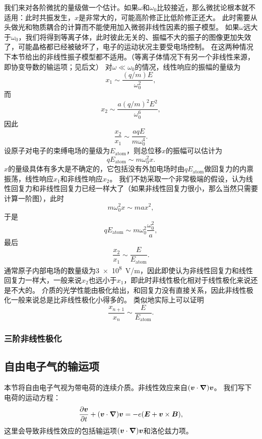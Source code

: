 我们来对各阶微扰的量级做一个估计。如果$\omega$和$\omega_0$比较接近，那么微扰论根本就不适用：此时共振发生，$x$是非常大的，可能高阶修正比低阶修正还大。
此时需要从头做光和物质耦合的计算而不能使用加入微弱非线性因素的振子模型。
如果$\omega$远大于$\omega_0$，我们将得到等离子体，此时彼此无关的、振幅不大的振子的图像更加失效了，可能晶格都已经被破坏了，电子的运动状况主要受电场控制。
在这两种情况下本节给出的非线性振子模型都不适用。（等离子体情况下有另一个非线性来源，即协变导数的输运项；见后文）
对$\omega \ll \omega_0$的情况，线性响应的振幅的量级为
\[
    x_1 \sim \frac{(q/m) E}{\omega_0^2},
\]
而
\[
    x_2 \sim \frac{a (q/m)^2 E^2}{\omega_0^6},
\]
因此
\begin{equation}
    \frac{x_2}{x_1} \sim \frac{a q E}{m \omega_0^4}.
\end{equation}
设原子对电子的束缚电场的量级为$E_\text{atom}$，则总位移$x$的振幅可以估计为
\[
    q E_\text{atom} \sim m \omega_0^2 x .
\]
$x$的量级具体有多大是不确定的，它包括没有外加电场时由$q E_\text{atom}$做回复力的内禀振荡，线性响应$x_1$和非线性响应$x_2$。
我们不妨采取一个非常极端的假设，认为线性回复力和非线性回复力已经一样大了（如果非线性回复力很小，那么当然只需要计算一阶图），此时
\[
    m \omega_0^2 x \sim m a x^2,
\]
于是
\[
    q E_\text{atom} \sim m \omega_0^2 \frac{\omega_0^2}{a},
\]
最后
\begin{equation}
    \frac{x_2}{x_1} \sim \frac{E}{E_\text{atom}}.
\end{equation}
通常原子内部电场的数量级为\SI{3e8}{V/m}，因此即使认为非线性回复力和线性回复力一样大，一般来说$x_2$也远小于$x_1$，即此时非线性极化相对于线性极化来说还是不大的。
介质的光学性能由极化给出，和回复力没有直接关系，因此非线性极化一般来说总是比非线性极化小得多的。
类似地实际上可以证明
\begin{equation}
    \frac{x_{n+1}}{x_n} \sim \frac{E}{E_\text{atom}}.
\end{equation}

\subsubsection{三阶非线性极化}

\subsection{自由电子气的输运项}

本节将自由电子气视为带电荷的连续介质。非线性效应来自$(\vb*{v} \cdot \grad) \vb*{v}$。
我们写下电荷的运动方程：
\begin{equation}
    \pdv{\vb*{v}}{t} + (\vb*{v} \cdot \grad) \vb*{v} = - e (\vb*{E} + \vb*{v} \times \vb*{B}),
\end{equation}
这里会导致非线性效应的包括输运项$(\vb*{v} \cdot \grad) \vb*{v}$和洛伦兹力项。

